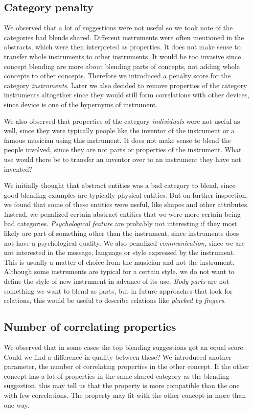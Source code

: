 \subsection{Category penalty}
We observed that a lot of suggestions were not useful so we took note of the categories bad blends shared. Different instruments were often mentioned in the abstracts, which were then interpreted as properties. It does not make sense to transfer whole instruments to other instruments. It would be too invasive since concept blending are more about blending parts of concepts, not adding whole concepts to other concepts. Therefore we introduced a penalty score for the category \emph{instruments}. Later we also decided to remove properties of the category instruments altogether since they would still form correlations with other devices, since device is one of the hypernyms of instrument.

We also observed that properties of the category \emph{individuals} were not useful as well, since they were typically people like the inventor of the instrument or a famous musician using this instrument. It does not make sense to blend the people involved, since they are not parts or properties of the instrument. What use would there be to transfer an inventor over to an instrument they have not invented?

We initially thought that abstract entities was a bad category to blend, since good blending examples are typically physical entities. But on further inspection, we found that some of these entities were useful, like shapes and other attributes. Instead, we penalized certain abstract entities that we were more certain being bad categories. \emph{Psychological feature} are probably not interesting if they most likely are part of something other than the instrument, since instruments does not have a psychological quality. We also penalized \emph{communication}, since we are not interested in the message, language or style expressed by the instrument. This is usually a matter of choice from the musician and not the instrument. Although some instruments are typical for a certain style, we do not want to define the style of new instrument in advance of its use. \emph{Body parts} are not something we want to blend as parts, but in future approaches that look for relations, this would be useful to describe relations like \emph{plucked by fingers}.

\subsection{Number of correlating properties}
We observed that in some cases the top blending suggestions got an equal score. Could we find a difference in quality between these? We introduced another parameter, the number of correlating properties in the other concept. If the other concept has a lot of properties in the same shared category as the blending suggestion, this may tell us that the property is more compatible than the one with few correlations. The property may fit with the other concept in more than one way.

